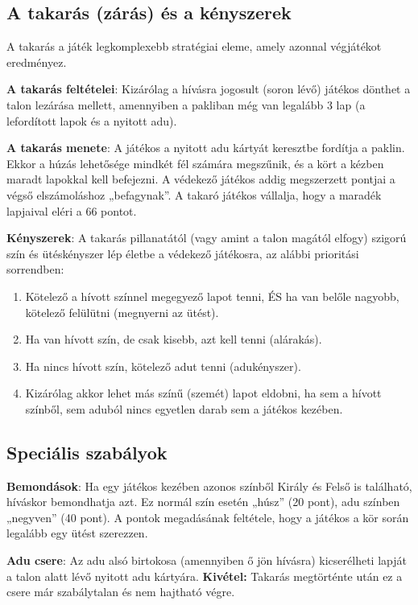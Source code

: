 \subsection{A takarás (zárás) és a kényszerek}
A takarás a játék legkomplexebb stratégiai eleme, amely azonnal végjátékot eredményez.
\begin{compactitem}
    \item \textbf{A takarás feltételei}: Kizárólag a hívásra jogosult (soron lévő) játékos dönthet a talon lezárása mellett, amennyiben a pakliban még van legalább 3 lap (a lefordított lapok és a nyitott adu).
    \item \textbf{A takarás menete}: A játékos a nyitott adu kártyát keresztbe fordítja a paklin. Ekkor a húzás lehetősége mindkét fél számára megszűnik, és a kört a kézben maradt lapokkal kell befejezni. A védekező játékos addig megszerzett pontjai a végső elszámoláshoz „befagynak”. A takaró játékos vállalja, hogy a maradék lapjaival eléri a 66 pontot.
    \item \textbf{Kényszerek}: A takarás pillanatától (vagy amint a talon magától elfogy) szigorú szín és ütéskényszer lép életbe a védekező játékosra, az alábbi prioritási sorrendben:
    \begin{enumerate}
        \item Kötelező a hívott színnel megegyező lapot tenni, ÉS ha van belőle nagyobb, kötelező felülütni (megnyerni az ütést).
        \item Ha van hívott szín, de csak kisebb, azt kell tenni (alárakás).
        \item Ha nincs hívott szín, kötelező adut tenni (adukényszer).
        \item Kizárólag akkor lehet más színű (szemét) lapot eldobni, ha sem a hívott színből, sem aduból nincs egyetlen darab sem a játékos kezében.
    \end{enumerate}
\end{compactitem}

\subsection{Speciális szabályok}
\begin{compactitem}
    \item \textbf{Bemondások}: Ha egy játékos kezében azonos színből Király és Felső is található, híváskor bemondhatja azt. Ez normál szín esetén „húsz” (20 pont), adu színben „negyven” (40 pont). A pontok megadásának feltétele, hogy a játékos a kör során legalább egy ütést szerezzen.
    \item \textbf{Adu csere}: Az adu alsó birtokosa (amennyiben ő jön hívásra) kicserélheti lapját a talon alatt lévő nyitott adu kártyára. \textbf{Kivétel:} Takarás megtörténte után ez a csere már szabálytalan és nem hajtható végre.
\end{compactitem}

